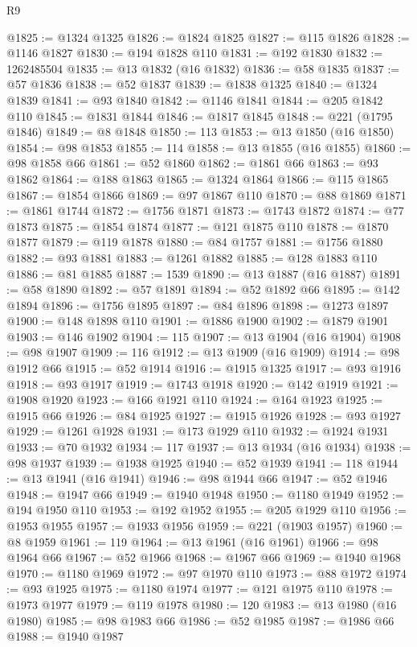 \begin{lexlean}{R9}
\begin{coremodule}
@1825 := @1324 @1325
@1826 := @1824 @1825
@1827 := @115 @1826
@1828 := @1146 @1827
@1830 := @194 @1828 @110
@1831 := @192 @1830
@1832 := 1262485504
@1835 := @13 @1832 (@16 @1832)
@1836 := @58 @1835
@1837 := @57 @1836
@1838 := @52 @1837
@1839 := @1838 @1325
@1840 := @1324 @1839
@1841 := @93 @1840
@1842 := @1146 @1841
@1844 := @205 @1842 @110
@1845 := @1831 @1844
@1846 := @1817 @1845
@1848 := @221 (@1795 @1846)
@1849 := @8 @1848
@1850 := 113
@1853 := @13 @1850 (@16 @1850)
@1854 := @98 @1853
@1855 := 114
@1858 := @13 @1855 (@16 @1855)
@1860 := @98 @1858 @66
@1861 := @52 @1860
@1862 := @1861 @66
@1863 := @93 @1862
@1864 := @188 @1863
@1865 := @1324 @1864
@1866 := @115 @1865
@1867 := @1854 @1866
@1869 := @97 @1867 @110
@1870 := @88 @1869
@1871 := @1861 @1744
@1872 := @1756 @1871
@1873 := @1743 @1872
@1874 := @77 @1873
@1875 := @1854 @1874
@1877 := @121 @1875 @110
@1878 := @1870 @1877
@1879 := @119 @1878
@1880 := @84 @1757
@1881 := @1756 @1880
@1882 := @93 @1881
@1883 := @1261 @1882
@1885 := @128 @1883 @110
@1886 := @81 @1885
@1887 := 1539
@1890 := @13 @1887 (@16 @1887)
@1891 := @58 @1890
@1892 := @57 @1891
@1894 := @52 @1892 @66
@1895 := @142 @1894
@1896 := @1756 @1895
@1897 := @84 @1896
@1898 := @1273 @1897
@1900 := @148 @1898 @110
@1901 := @1886 @1900
@1902 := @1879 @1901
@1903 := @146 @1902
@1904 := 115
@1907 := @13 @1904 (@16 @1904)
@1908 := @98 @1907
@1909 := 116
@1912 := @13 @1909 (@16 @1909)
@1914 := @98 @1912 @66
@1915 := @52 @1914
@1916 := @1915 @1325
@1917 := @93 @1916
@1918 := @93 @1917
@1919 := @1743 @1918
@1920 := @142 @1919
@1921 := @1908 @1920
@1923 := @166 @1921 @110
@1924 := @164 @1923
@1925 := @1915 @66
@1926 := @84 @1925
@1927 := @1915 @1926
@1928 := @93 @1927
@1929 := @1261 @1928
@1931 := @173 @1929 @110
@1932 := @1924 @1931
@1933 := @70 @1932
@1934 := 117
@1937 := @13 @1934 (@16 @1934)
@1938 := @98 @1937
@1939 := @1938 @1925
@1940 := @52 @1939
@1941 := 118
@1944 := @13 @1941 (@16 @1941)
@1946 := @98 @1944 @66
@1947 := @52 @1946
@1948 := @1947 @66
@1949 := @1940 @1948
@1950 := @1180 @1949
@1952 := @194 @1950 @110
@1953 := @192 @1952
@1955 := @205 @1929 @110
@1956 := @1953 @1955
@1957 := @1933 @1956
@1959 := @221 (@1903 @1957)
@1960 := @8 @1959
@1961 := 119
@1964 := @13 @1961 (@16 @1961)
@1966 := @98 @1964 @66
@1967 := @52 @1966
@1968 := @1967 @66
@1969 := @1940 @1968
@1970 := @1180 @1969
@1972 := @97 @1970 @110
@1973 := @88 @1972
@1974 := @93 @1925
@1975 := @1180 @1974
@1977 := @121 @1975 @110
@1978 := @1973 @1977
@1979 := @119 @1978
@1980 := 120
@1983 := @13 @1980 (@16 @1980)
@1985 := @98 @1983 @66
@1986 := @52 @1985
@1987 := @1986 @66
@1988 := @1940 @1987

\end{coremodule}
\end{lexlean}
